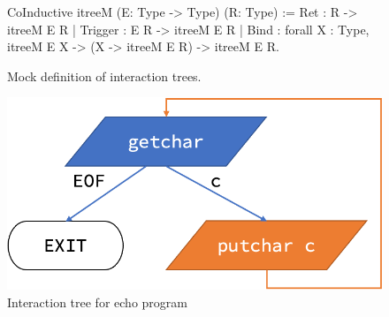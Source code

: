 \begin{figure}
\begin{coq}
  CoInductive itreeM (E: Type -> Type) (R: Type) :=
    Ret     : R   -> itreeM E R
  | Trigger : E R -> itreeM E R
  | Bind    : forall {X : Type}, itreeM E X -> (X -> itreeM E R) -> itreeM E R.
\end{coq}
\caption{Mock definition of interaction trees.}
\label{fig:mock-itree}
\end{figure}

\begin{figure}
  \includegraphics[width=.5\linewidth]{figures/echo-itree}
  \caption{Interaction tree for echo program}
  \label{fig:echo-itree}
\end{figure}

